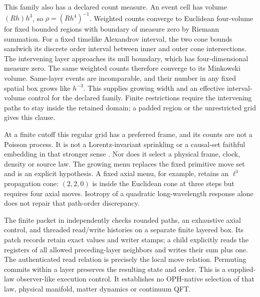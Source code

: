 This family also has a declared count measure. An event cell has volume
$(Rh)h^3$, so $\rho=(Rh^4)^{-1}$. Weighted counts converge to Euclidean
four-volume for fixed bounded regions with boundary of measure zero by
Riemann summation. For a fixed timelike Alexandrov interval, the two cone
bounds sandwich its discrete order interval between inner and outer cone
intersections. The intervening layer approaches its null boundary, which
has four-dimensional measure zero. The same weighted counts therefore
converge to its Minkowski volume. Same-layer events are incomparable, and
their number in any fixed spatial box grows like $h^{-3}$. This supplies
growing width and an effective interval-volume control for the declared
family.
Finite restrictions require the intervening paths to stay inside the
retained domain; a padded region or the unrestricted grid gives this clause.

At a finite cutoff this regular grid has a preferred frame, and its counts
are not a Poisson process. It is not a Lorentz-invariant sprinkling or a
causal-set faithful embedding in that stronger sense
\cite{bombellihensonsorkin2009}. Nor does it select a physical frame, clock,
density or source law. The growing menu replaces the fixed primitive move
set and is an explicit hypothesis. A fixed axial menu, for example, retains
an $\ell^1$ propagation cone: $(2,2,0)$ is inside the Euclidean cone at
three steps but requires four axial moves. Isotropy of a quadratic
long-wavelength response alone does not repair that path-order discrepancy.

The finite packet in  independently checks
rounded paths, an exhaustive axial control, and threaded read/write
histories on a separate finite layered box. Its patch records retain exact
values and writer stamps; a child explicitly reads the registers of all
allowed preceding-layer neighbors and writes their sum plus one. The
authenticated read relation is precisely the local move relation. Permuting
commits within a layer preserves the resulting state and order. This is a
supplied-law observer-like execution control. It establishes no OPH-native
selection of that law, physical manifold, matter dynamics or continuum QFT.
